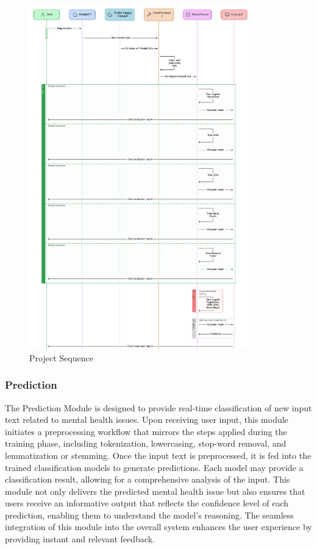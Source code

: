 \begin{figure}[h!]  
    \centering
    \includegraphics[width=0.85\textwidth]{Images/Project Sequence.png}  
    \caption{Project Sequence}
    \label{Project Sequence}  %
\end{figure}

\subsubsection{Prediction}
\noindent
The Prediction Module is designed to provide real-time classification of new input text related to mental health issues. Upon receiving user input, this module initiates a preprocessing workflow that mirrors the steps applied during the training phase, including tokenization, lowercasing, stop-word removal, and lemmatization or stemming. Once the input text is preprocessed, it is fed into the trained classification models to generate predictions. Each model may provide a classification result, allowing for a comprehensive analysis of the input. This module not only delivers the predicted mental health issue but also ensures that users receive an informative output that reflects the confidence level of each prediction, enabling them to understand the model's reasoning. The seamless integration of this module into the overall system enhances the user experience by providing instant and relevant feedback.

